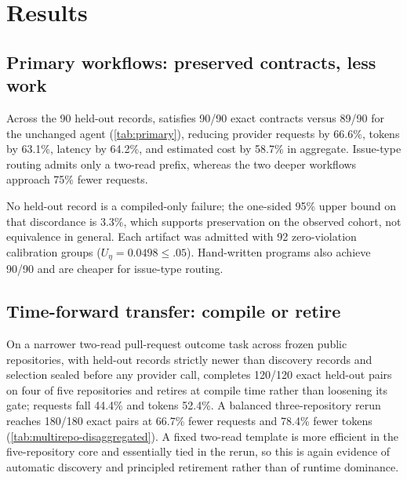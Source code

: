 \section{Results}

\subsection{Primary workflows: preserved contracts, less work}
\label{sec:res-primary}

\begin{table}[t]
  \centering
  \caption{Primary live-provider results ($n=30$ held-out records per family).
  ``Interfaces'' counts provider-visible tool interfaces. All conditions see
  identical records, model, and grader; \emph{Manual} is hand-written with full
  knowledge of the workflow.}
  \label{tab:primary}
  \footnotesize
  \setlength{\tabcolsep}{3.5pt}
  
\end{table}

Across the 90 held-out records, \method satisfies 90/90 exact contracts versus
89/90 for the unchanged agent (\cref{tab:primary}), reducing provider requests by
66.6\%, tokens by 63.1\%, latency by 64.2\%, and estimated cost by 58.7\% in
aggregate. Issue-type routing admits only a two-read prefix, whereas the two
deeper workflows approach 75\% fewer requests.

No held-out record is a compiled-only failure; the one-sided 95\% upper bound on
that discordance is 3.3\%, which supports preservation on the observed cohort, not
equivalence in general. Each artifact was admitted with 92 zero-violation
calibration groups ($U_\eta=0.0498\le.05$). Hand-written programs also achieve
90/90 and are cheaper for issue-type routing.

\subsection{Time-forward transfer: compile or retire}
\label{sec:res-multirepo}

On a narrower two-read pull-request outcome task across frozen public
repositories, with held-out records strictly newer than discovery records and
selection sealed before any provider call, \method completes 120/120 exact
held-out pairs on four of five repositories and retires  at
compile time rather than loosening its gate; requests fall 44.4\% and tokens
52.4\%. A balanced three-repository rerun reaches 180/180 exact pairs at 66.7\%
fewer requests and 78.4\% fewer tokens
(\cref{tab:multirepo-disaggregated}). A fixed two-read template is more efficient
in the five-repository core and essentially tied in the rerun, so this is again
evidence of automatic discovery and principled retirement rather than of runtime
dominance.

